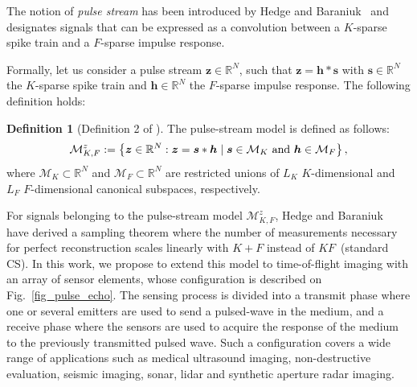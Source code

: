 \documentclass{article}
\newcommand{\etal}{\textit{et al.}}
\newcommand{\vect}[1]{\bm{#1}}
\theoremstyle{definition}
\newtheorem{defn}{Definition}
\begin{document}
The notion of \textit{pulse stream} has been introduced by Hedge and Baraniuk~\cite{Hedge_TSP_2011} and designates signals that can be expressed as a convolution between a $K$-sparse spike train and a $F$-sparse impulse response. 
%
%

Formally, let us consider a pulse stream $\vect{z} \in \mathbb{R}^N$, such that $\vect{z} = \vect{h} \ast \vect{s}$ with $\vect{s} \in \mathbb{R}^N$ the $K$-sparse spike train and $\vect{h} \in \mathbb{R}^N$ the $F$-sparse impulse response. 
The following definition holds:
\begin{defn}[Definition 2 of \cite{Hedge_TSP_2011}]	
The pulse-stream model is defined as follows:
\begin{equation}
\label{eq_pulse_stream_model}
\mathcal{M}^z_{K,F}:=\left\lbrace \vect{z} \in \mathbb{R}^N: \vect{z} = \vect{s} \ast \vect{h} \; | \; \vect{s} \in \mathcal{M}_K \textnormal{ and } \vect{h} \in \mathcal{M}_F \right \rbrace,
\end{equation}
where $\mathcal{M}_K \subset \mathbb{R}^N$ and $\mathcal{M}_F \subset \mathbb{R}^N$ are restricted unions of $L_K$ $K$-dimensional and $L_F$ $F$-dimensional canonical subspaces, respectively.
\end{defn} 

For signals belonging to the pulse-stream model $\mathcal{M}^z_{K,F}$, Hedge and Baraniuk~\cite{Hedge_TSP_2011} have derived a sampling theorem where the number of measurements necessary for perfect reconstruction scales linearly with $K + F$ instead of $KF$~(standard CS). 
In this work, we propose to extend this model to time-of-flight imaging with an array of sensor elements, whose configuration is described on Fig.~\ref{fig_pulse_echo}. 
The sensing process is divided into a transmit phase where one or several emitters are used to send a pulsed-wave in the medium, and a receive phase where the sensors are used to acquire the response of the medium to the previously transmitted pulsed wave. 
Such a configuration covers a wide range of applications such as medical ultrasound imaging, non-destructive evaluation, seismic imaging, sonar, lidar and synthetic aperture radar imaging.
\end{document}
